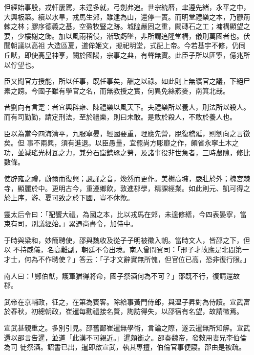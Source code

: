 \begin{pinyinscope}
 但經始事殷，戎軒屢駕，未遑多就，弓劍弗追。世宗統曆，聿遵先緒，永平之中，大興板築。續以水旱，戎馬生郊，雖逮為山，還停一簣。而明堂禮樂之本，乃鬱荊棘之林；膠序德義之基，空盈牧豎之跡。城隍嚴固之重，闕磚石之工；墉構顯望之要，少樓榭之飾。加以風雨稍侵，漸致虧墜，非所謂追隆堂構，儀刑萬國者也。伏聞朝議以高祖
 大造區夏，道侔姬文，擬祀明堂，式配上帝。今若基宇不修，仍同丘畎，即使高皇神享，闕於國陽，宗事之典，有聲無實。此臣子所以匪寧，億兆所以佇望也。



 臣又聞官方授能，所以任事，既任事矣，酬之以祿。如此則上無曠官之議，下絕尸素之謗。今國子雖有學官之名，而無教授之實，何異免絲燕麥，南箕北哉。



 昔劉向有言寔：者宜興辟雍、陳禮樂以風天下。夫禮樂所以養人，刑法所以殺人。而有司勤勤，請定刑法，至於禮樂，則曰未敢。是敢於殺人，不敢於養人也。



 臣以為當今四海清平，九服寧晏，經國要重，理應先營，脫復稽延，則劉向之言徵矣。但
 事不兩興，須有進退。以臣愚量，宜罷尚方彫靡之作，頗省永寧土木之功，並減瑤光材瓦之力，兼分石窟鐫琢之勞，及諸事役非世急者，三時農隙，修比數條。



 使辟雍之禮，蔚爾而復興；諷誦之音，煥然而更作。美榭高墉，嚴壯於外；槐宮棘寺，顯麗於中。更明古今，重遵鄉飲，敦進郡學，精課經業。如此則元、凱可得之於上序，游、夏可致之於下國，豈不休歟。



 靈太后令曰：「配饗大禮，為國之本，比以戎馬在郊，未遑修繕，今四表晏寧，當束有司，別議經始。」累遷尚書令，加侍中。



 于時與梁和，妙簡聘使，邵與魏收及從子子明被徵入朝。當時文人，皆邵之下，但以
 不持威儀，名高難副，朝廷不令出境。南人曾問賓司：「邢子才故應是北間第一才士，何為不作聘使？」答云：「子才文辭實無所愧，但官位已高，恐非復行限。」



 南人曰：「鄭伯猷，護軍猶得將命，國子祭酒何為不可？」邵既不行，復請還故郡。



 武帝在京輔政，征之，在第為賓客。除給事黃門侍郎，與溫子昇對為侍讀。宣武富於春秋，初總朝政，崔暹每勸禮接名賢，詢訪得失，以邵宿有名望，故請徵焉。



 宣武甚親重之。多別引見。邵舊鄙崔暹無學術，言論之際，遂云暹無所知解。宣武還以邵言告暹，並道「此漢不可親近。」暹頗銜之。邵奏魏帝，發敕用妻兄李伯倫為司
 徒祭酒。詔書已出，暹即啟宣武，執其專擅，伯倫官事便寢。邵由是被疏。




\end{pinyinscope}
